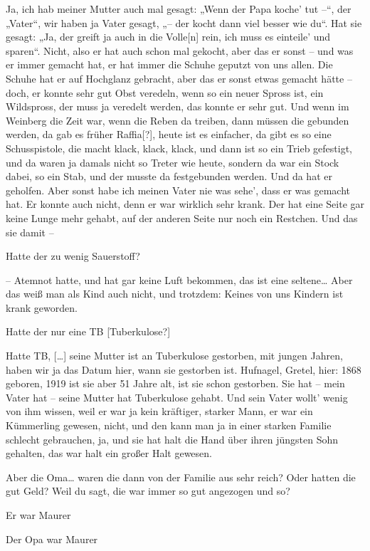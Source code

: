 \documentclass[ngerman,]{article}
\providecommand{\tightlist}{%
  \setlength{\itemsep}{0pt}\setlength{\parskip}{0pt}}
\begin{document}
\begin{multicols}{3}
\begin{description}
\tightlist
\item[Käthe]
Ja, ich hab meiner Mutter auch mal gesagt: „Wenn der Papa koche' tut –“,
der „Vater“, wir haben ja Vater gesagt, „– der kocht dann viel besser
wie du“. Hat sie gesagt: „Ja, der greift ja auch in die Volle{[}n{]}
rein, ich muss es einteile' und sparen“. Nicht, also er hat auch schon
mal gekocht, aber das er sonst – und was er immer gemacht hat, er hat
immer die Schuhe geputzt von uns allen. Die Schuhe hat er auf Hochglanz
gebracht, aber das er sonst etwas gemacht hätte – doch, er konnte sehr
gut Obst veredeln, wenn so ein neuer Spross ist, ein Wildspross, der
muss ja veredelt werden, das konnte er sehr gut. Und wenn im Weinberg
die Zeit war, wenn die Reben da treiben, dann müssen die gebunden
werden, da gab es früher Raffia{[}?{]}, heute ist es einfacher, da gibt
es so eine Schusspistole, die macht klack, klack, klack, und dann ist so
ein Trieb gefestigt, und da waren ja damals nicht so Treter wie heute,
sondern da war ein Stock dabei, so ein Stab, und der musste da
festgebunden werden. Und da hat er geholfen. Aber sonst habe ich meinen
Vater nie was sehe', dass er was gemacht hat. Er konnte auch nicht, denn
er war wirklich sehr krank. Der hat eine Seite gar keine Lunge mehr
gehabt, auf der anderen Seite nur noch ein Restchen. Und das sie damit –
\item[Ruth]
Hatte der zu wenig Sauerstoff?
\item[Käthe]
– Atemnot hatte, und hat gar keine Luft bekommen, das ist eine
seltene\ldots{} Aber das weiß man als Kind auch nicht, und trotzdem:
Keines von uns Kindern ist krank geworden.
\item[Ruth]
Hatte der nur eine TB {[}Tuberkulose?{]}
\item[Käthe]
Hatte TB, {[}\ldots{}{]} seine Mutter ist an Tuberkulose gestorben, mit
jungen Jahren, haben wir ja das Datum hier, wann sie gestorben ist.
Hufnagel, Gretel, hier: 1868 geboren, 1919 ist sie aber 51 Jahre alt,
ist sie schon gestorben. Sie hat – mein Vater hat – seine Mutter hat
Tuberkulose gehabt. Und sein Vater wollt' wenig von ihm wissen, weil er
war ja kein kräftiger, starker Mann, er war ein Kümmerling gewesen,
nicht, und den kann man ja in einer starken Familie schlecht gebrauchen,
ja, und sie hat halt die Hand über ihren jüngsten Sohn gehalten, das war
halt ein großer Halt gewesen.
\item[Ruth]
Aber die Oma\ldots{} waren die dann von der Familie aus sehr reich? Oder
hatten die gut Geld? Weil du sagt, die war immer so gut angezogen und
so?
\item[Käthe]
Er war Maurer
\item[Ruth]
Der Opa war Maurer
\end{description}


\end{multicols}
\end{document}
